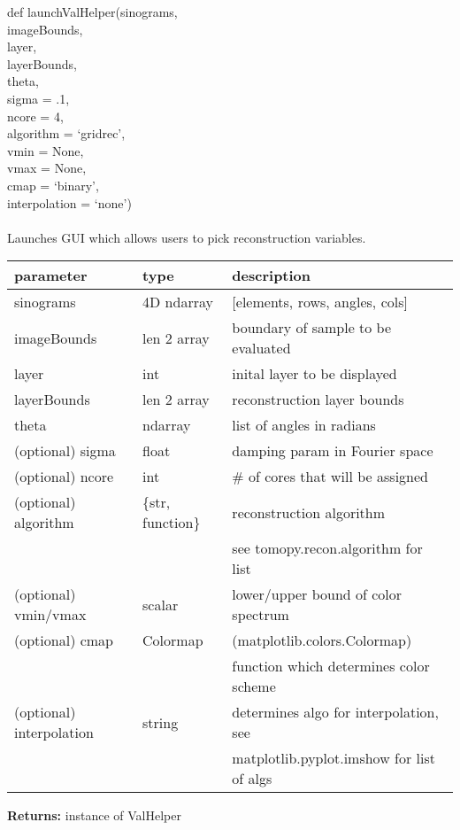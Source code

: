 \documentclass[10pt]{article}
\begin{document}
\begin{center} def launchValHelper(sinograms,\\ imageBounds,\\ layer,\\ layerBounds,\\ theta,\\ sigma = .1,\\ ncore = 4,\\ algorithm = `gridrec',\\ vmin = None,\\ vmax = None,\\ cmap = `binary',\\ interpolation = `none')\\
\ \\ Launches GUI which allows users to pick reconstruction variables.
\begin{table}[H]
    \centering
    \begin{tabular}{|l|l|l|}
        \hline
        \textbf{parameter} & \textbf{type} &\textbf{description}  \\ \hline
        sinograms & 4D ndarray & [elements, rows, angles, cols] \\ \hline
        imageBounds & len 2 array & boundary of sample to be evaluated \\ \hline
        layer & int & inital layer to be displayed\\ \hline
        layerBounds&len 2 array&reconstruction layer bounds\\ \hline
        theta & ndarray & list of angles in radians\\ \hline
        (optional) sigma&float &damping param in Fourier space \\ \hline
        (optional) ncore&int & \# of cores that will be assigned \\ \hline
        (optional) algorithm& \{str, function\} & reconstruction algorithm\\
        & & see tomopy.recon.algorithm for list\\ \hline
        (optional) vmin/vmax & scalar & lower/upper bound of color spectrum \\ \hline
        (optional) cmap & Colormap & (matplotlib.colors.Colormap)\\ && function which determines color scheme \\ \hline
        (optional) interpolation & string &  determines algo for interpolation, see\\
         & & matplotlib.pyplot.imshow for list of algs \\ \hline

    \end{tabular}
\end{table}
\textbf{Returns:}  instance of ValHelper\\
\end{center}
\end{document}
